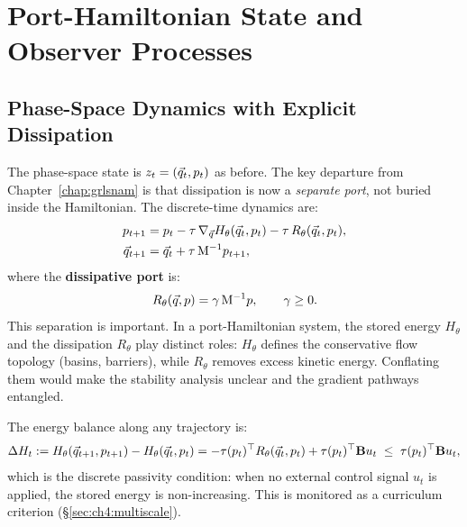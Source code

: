 \section{Port-Hamiltonian State and Observer Processes}
\label{sec:ch4:portham}

\subsection{Phase-Space Dynamics with Explicit Dissipation}
\label{subsec:ch4:dynamics}

The phase-space state is $z_t = (\vec{q}_t, p_t)$ as before.
The key departure from Chapter~\ref{chap:grlsnam} is that dissipation
is now a \emph{separate port}, not buried inside the Hamiltonian.
The discrete-time dynamics are:
\begin{align}
  p_{t+1}
  &= p_t
     - \tau\,\nabla_{\vec{q}} H_\theta(\vec{q}_t,p_t)
     - \tau\,R_\theta(\vec{q}_t,p_t),
  \label{eq:ch4:p_update} \\
  \vec{q}_{t+1}
  &= \vec{q}_t + \tau\,\mathrm{M}^{-1}p_{t+1},
  \label{eq:ch4:q_update}
\end{align}
where the \textbf{dissipative port} is:
\begin{equation}
  R_\theta(\vec{q},p) = \gamma\,\mathrm{M}^{-1}p,
  \qquad \gamma \geq 0.
  \label{eq:ch4:dissipation}
\end{equation}
This separation is important.
In a port-Hamiltonian system, the stored energy $H_\theta$ and the
dissipation $R_\theta$ play distinct roles: $H_\theta$ defines the
conservative flow topology (basins, barriers), while $R_\theta$ removes
excess kinetic energy.
Conflating them would make the stability analysis unclear and the
gradient pathways entangled.

The energy balance along any trajectory is:
\begin{equation}
  \Delta H_t
  := H_\theta(\vec{q}_{t+1},p_{t+1}) - H_\theta(\vec{q}_t,p_t)
  = -\tau(p_t)^\top R_\theta(\vec{q}_t,p_t)
    + \tau(p_t)^\top \mathbf{B} u_t
  \;\leq\; \tau(p_t)^\top \mathbf{B} u_t,
  \label{eq:ch4:energy_balance}
\end{equation}
which is the discrete passivity condition:
when no external control signal $u_t$ is applied, the stored energy
is non-increasing.
This is monitored as a curriculum criterion (§\ref{sec:ch4:multiscale}).

